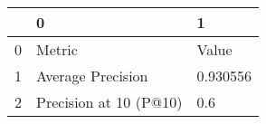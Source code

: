 \begin{tabular}{lll}
\toprule
{} &                       0 &         1 \\
\midrule
0 &                  Metric &     Value \\
1 &       Average Precision &  0.930556 \\
2 &  Precision at 10 (P@10) &       0.6 \\
\bottomrule
\end{tabular}